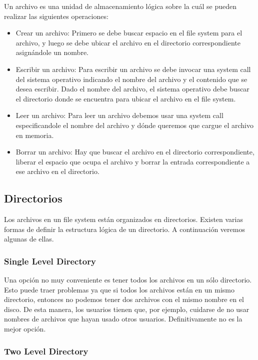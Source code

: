 \documentclass{article}
\begin{document}
Un archivo es una unidad de almacenamiento l\'ogica sobre la cu\'al se pueden realizar las siguientes operaciones:

\begin{itemize}
\item Crear un archivo: Primero se debe buscar espacio en el file system para el archivo, y luego se debe ubicar el archivo en el directorio correspondiente asign\'andole un nombre.
\item Escribir un archivo: Para escribir un archivo se debe invocar una system call del sistema operativo indicando el nombre del archivo y el contenido que se desea escribir. Dado el nombre del archivo, el sistema operativo debe buscar el directorio donde se encuentra para ubicar el archivo en el file system.
\item Leer un archivo: Para leer un archivo debemos usar una system call especificandole el nombre del archivo y d\'onde queremos que cargue el archivo en memoria.
\item Borrar un archivo: Hay que buscar el archivo en el directorio correspondiente, liberar el espacio que ocupa el archivo y borrar la entrada correspondiente a ese archivo en el directorio.
\end{itemize}

\subsection{Directorios}

Los archivos en un file system est\'an organizados en directorios. Existen varias formas de definir la estructura l\'ogica de un directorio. A continuaci\'on veremos algunas de ellas.

\subsubsection{Single Level Directory}

Una opci\'on no muy conveniente es tener todos los archivos en un s\'olo directorio. Esto puede traer problemas ya que si todos los archivos est\'an en un mismo directorio, entonces no podemos tener dos archivos con el mismo nombre en el disco. De esta manera, los usuarios tienen que, por ejemplo, cuidarse de no usar nombres de archivos que hayan usado otros usuarios. Definitivamente no es la mejor opci\'on.

\subsubsection{Two Level Directory}
\end{document}
